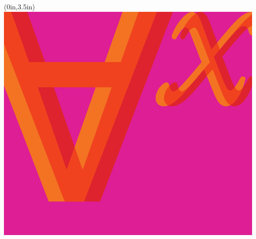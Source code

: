 \documentclass[openany,oneside,11pt]{memoir}
\begin{document}
\midsloppy

\thispagestyle{empty}
\pagecolor{lyallpink}\afterpage{\nopagecolor}
\begin{textblock*}{\stockwidth}(0in,3.5in)
  \noindent\includegraphics{assets/forallx-coverart-screen.pdf}
\end{textblock*}
\end{document}
